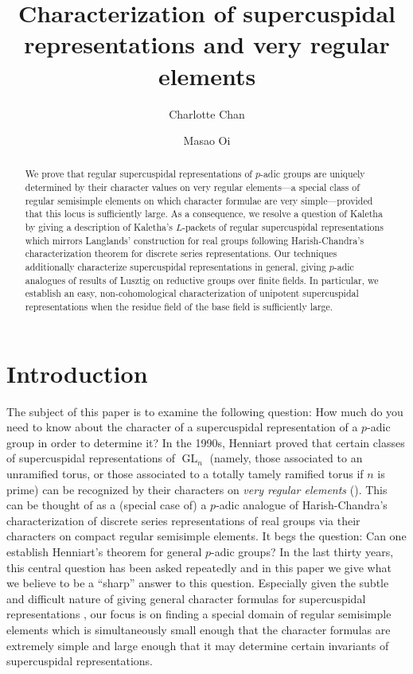 \documentclass{amsart}
\title{Characterization of supercuspidal representations and very regular elements}
\author{Charlotte Chan}
\author{Masao Oi}
\DeclareMathOperator{\GL}{GL}
\theoremstyle{plain}
\theoremstyle{definition}
\theoremstyle{remark}
\theoremstyle{theorem}
\begin{document}
\begin{abstract}
    We prove that regular supercuspidal representations of $p$-adic groups are uniquely determined by their character values on very regular elements---a special class of regular semisimple elements on which character formulae are very simple---provided that this locus is sufficiently large. As a consequence, we resolve a question of Kaletha by giving a description of Kaletha's $L$-packets of regular supercuspidal representations which mirrors Langlands' construction for real groups following Harish-Chandra's characterization theorem for discrete series representations. Our techniques additionally characterize supercuspidal representations in general, giving $p$-adic analogues of results of Lusztig on reductive groups over finite fields. In particular, we establish an easy, non-cohomological characterization of unipotent supercuspidal representations when the residue field of the base field is sufficiently large.
\end{abstract}


\maketitle

\section{Introduction} \label{sec:intro}

The subject of this paper is to examine the following question: How much do you need to know about the character of a supercuspidal representation of a $p$-adic group in order to determine it? In the 1990s, Henniart proved that certain classes of supercuspidal representations of $\GL_n$ (namely, those associated to an unramified torus, or those associated to a totally tamely ramified torus if $n$ is prime) can be recognized by their characters on \textit{very regular elements} (\cite{Hen92,Hen93}). This can be thought of as a (special case of) a $p$-adic analogue of Harish-Chandra's characterization of discrete series representations of real groups via their characters on compact regular semisimple elements.
It begs the question: Can one establish Henniart's theorem for general $p$-adic groups? In the last thirty years, this central question has been asked repeatedly \cite{AS09,Kal19} and in this paper we give what we believe to be a ``sharp'' answer to this question. Especially given the subtle and difficult nature of giving general character formulas for supercuspidal representations \cite{AS09,DS18,Spi18,Spi21,FKS21}, our focus is on finding a special domain of regular semisimple elements which is simultaneously small enough that the character formulas are extremely simple and large enough that it may determine certain invariants of supercuspidal representations. 
\end{document}
